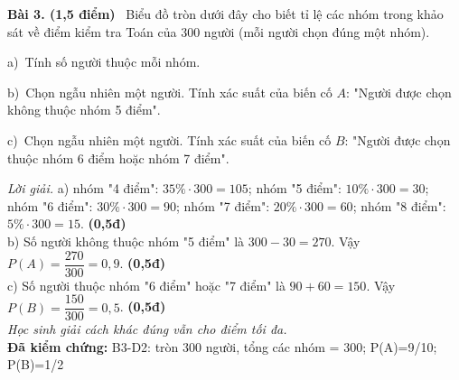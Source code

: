 \documentclass[12pt,a4paper]{article}
\newif\ifloigiai \loigiaitrue   %
\newenvironment{bai}[4]{\par\medskip\noindent\textbf{Bài #1. (#2 điểm)}\ }{\par}
\newcommand{\y}[2]{\par\hspace*{1em}#1)~#2}             %
\newcommand{\loigiai}[1]{\ifloigiai\par\smallskip\noindent\textit{Lời giải.} #1\par\fi}
\newcommand{\diem}[1]{\ifloigiai\hfill\textbf{(#1đ)}\fi}  %
\begin{document}
\begin{bai}{3}{1,5}{B3-D2}{TS10-D42-B3}
Biểu đồ tròn dưới đây cho biết tỉ lệ các nhóm trong khảo sát về điểm kiểm tra Toán của 300 người (mỗi người chọn đúng một nhóm).
\begin{center}
\end{center}
\y{a}{Tính số người thuộc mỗi nhóm.}
\y{b}{Chọn ngẫu nhiên một người. Tính xác suất của biến cố $A$: "Người được chọn không thuộc nhóm 5 điểm".}
\y{c}{Chọn ngẫu nhiên một người. Tính xác suất của biến cố $B$: "Người được chọn thuộc nhóm 6 điểm hoặc nhóm 7 điểm".}
\loigiai{
a) nhóm "4 điểm": $35\%\cdot300=105$; nhóm "5 điểm": $10\%\cdot300=30$; nhóm "6 điểm": $30\%\cdot300=90$; nhóm "7 điểm": $20\%\cdot300=60$; nhóm "8 điểm": $5\%\cdot300=15$. \diem{0,5}\\
b) Số người không thuộc nhóm "5 điểm" là $300-30=270$. Vậy $P(A)=\dfrac{270}{300}=0{,}9$. \diem{0,5}\\
c) Số người thuộc nhóm "6 điểm" hoặc "7 điểm" là $90+60=150$. Vậy $P(B)=\dfrac{150}{300}=0{,}5$. \diem{0,5}
\\\textit{Học sinh giải cách khác đúng vẫn cho điểm tối đa.}\\
\textbf{Đã kiểm chứng:} B3-D2: tròn 300 người, tổng các nhóm = 300; P(A)=9/10; P(B)=1/2
}
\end{bai}
\end{document}
